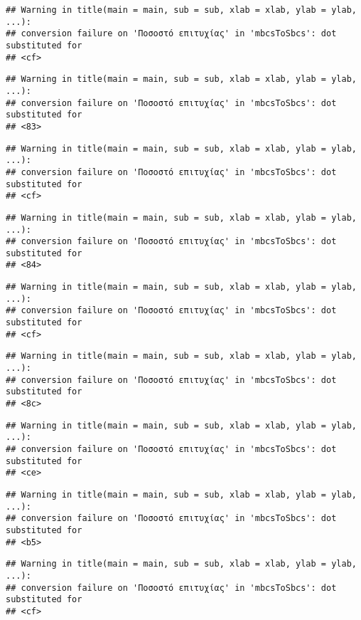 \documentclass[
]{article}
\begin{document}
\begin{verbatim}
## Warning in title(main = main, sub = sub, xlab = xlab, ylab = ylab, ...):
## conversion failure on 'Ποσοστό επιτυχίας' in 'mbcsToSbcs': dot substituted for
## <cf>
\end{verbatim}

\begin{verbatim}
## Warning in title(main = main, sub = sub, xlab = xlab, ylab = ylab, ...):
## conversion failure on 'Ποσοστό επιτυχίας' in 'mbcsToSbcs': dot substituted for
## <83>
\end{verbatim}

\begin{verbatim}
## Warning in title(main = main, sub = sub, xlab = xlab, ylab = ylab, ...):
## conversion failure on 'Ποσοστό επιτυχίας' in 'mbcsToSbcs': dot substituted for
## <cf>
\end{verbatim}

\begin{verbatim}
## Warning in title(main = main, sub = sub, xlab = xlab, ylab = ylab, ...):
## conversion failure on 'Ποσοστό επιτυχίας' in 'mbcsToSbcs': dot substituted for
## <84>
\end{verbatim}

\begin{verbatim}
## Warning in title(main = main, sub = sub, xlab = xlab, ylab = ylab, ...):
## conversion failure on 'Ποσοστό επιτυχίας' in 'mbcsToSbcs': dot substituted for
## <cf>
\end{verbatim}

\begin{verbatim}
## Warning in title(main = main, sub = sub, xlab = xlab, ylab = ylab, ...):
## conversion failure on 'Ποσοστό επιτυχίας' in 'mbcsToSbcs': dot substituted for
## <8c>
\end{verbatim}

\begin{verbatim}
## Warning in title(main = main, sub = sub, xlab = xlab, ylab = ylab, ...):
## conversion failure on 'Ποσοστό επιτυχίας' in 'mbcsToSbcs': dot substituted for
## <ce>
\end{verbatim}

\begin{verbatim}
## Warning in title(main = main, sub = sub, xlab = xlab, ylab = ylab, ...):
## conversion failure on 'Ποσοστό επιτυχίας' in 'mbcsToSbcs': dot substituted for
## <b5>
\end{verbatim}

\begin{verbatim}
## Warning in title(main = main, sub = sub, xlab = xlab, ylab = ylab, ...):
## conversion failure on 'Ποσοστό επιτυχίας' in 'mbcsToSbcs': dot substituted for
## <cf>
\end{verbatim}
\end{document}
